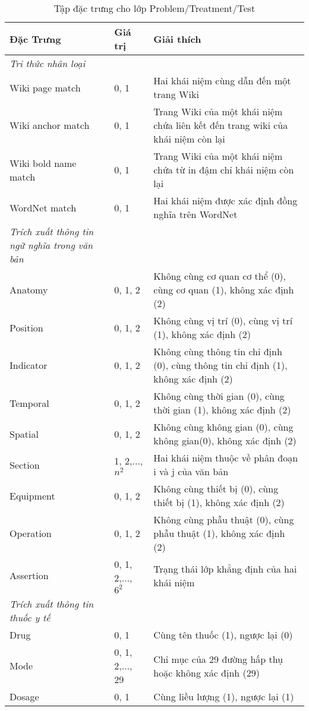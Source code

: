 \begin{table}[th]
\centering
\caption{Tập đặc trưng cho lớp Problem/Treatment/Test \label{tab:ProbTreatTestFeatures}}
\footnotesize\sffamily

\begin{tabularx}{\textwidth}{@{}P{\raggedright}{0.3}lL@{}}
\toprule 
\textbf{Đặc Trưng} & \textbf{Giá trị} & \textbf{Giải thích}\\
\midrule
\textit{Tri thức nhân loại}\\
Wiki page match & 0, 1 & Hai khái niệm cùng dẫn đến một trang Wiki\\
Wiki anchor match & 0, 1 & Trang Wiki của một khái niệm chứa liên kết đến trang wiki của khái niệm còn lại\\
Wiki bold name match & 0, 1 & Trang Wiki của một khái niệm chứa từ in đậm chỉ khái niệm còn lại\\
WordNet match & 0, 1 & Hai khái niệm được xác định đồng nghĩa trên WordNet\\
\textit{Trích xuất thông tin ngữ nghĩa trong văn bản}\\
Anatomy & 0, 1, 2 & Không cùng cơ quan cơ thể (0), cùng cơ quan (1), không xác định (2)\\
Position & 0, 1, 2 & Không cùng vị trí (0), cùng vị trí (1), không xác định (2)\\
Indicator & 0, 1, 2 & Không cùng thông tin chỉ định (0), cùng thông tin chỉ định (1), không xác định (2)\\
Temporal & 0, 1, 2 & Không cùng thời gian (0), cùng thời gian (1), không xác định (2)\\
Spatial & 0, 1, 2 & Không cùng không gian (0), cùng không gian(0), không xác định (2)\\
Section & 1, 2,..., $n^{2}$ & Hai khái niệm thuộc về phân đoạn i và j của văn bản\\
Equipment & 0, 1, 2 & Không cùng thiết bị (0), cùng thiết bị (1), không xác định (2)\\
Operation & 0, 1, 2 & Không cùng phẫu thuật (0), cùng phẫu thuật (1), không xác định (2)\\
Assertion & 0, 1, 2,..., $6^{2}$ & Trạng thái lớp khẳng định của hai khái niệm\\
\textit{Trích xuất thông tin thuốc y tế}\\
Drug & 0, 1 & Cùng tên thuốc (1), ngược lại (0)\\
Mode & 0, 1, 2,..., 29 & Chỉ mục của 29 đường hấp thụ hoặc không xác định (29)\\
Dosage & 0, 1 & Cùng liều lượng (1), ngược lại (1)\\

\end{tabularx}
\end{table}
